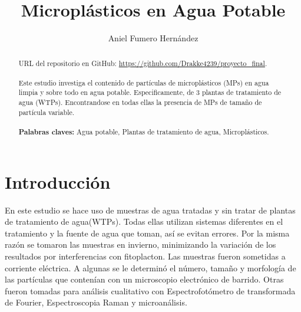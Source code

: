 \documentclass[a4paper,11pt]{article}
\title{Microplásticos en Agua Potable}
\author{Aniel Fumero Hernández}
\begin{document}
\maketitle
	\begin{abstract}
	
	URL del repositorio en GitHub:  \href{https://github.com/Drakke4239/proyecto\_final}{https://github.com/Drakke4239/proyecto\_final}.\\
	\\Este estudio investiga el contenido de partículas de microplásticos (MPs) en agua limpia y sobre todo en agua potable. Especificamente, de 3 plantas de tratamiento de agua (WTPs). Encontrandose en todas ellas la presencia de MPs de tamaño de partícula variable.\\\\
	\textbf{Palabras claves:} Agua potable, Plantas de tratamiento de agua, Microplásticos.
	
	\end{abstract}
\tableofcontents
\section{Introducción}
En este estudio se hace uso de muestras de agua tratadas y sin tratar de plantas de tratamiento de agua(WTPs). Todas ellas utilizan sistemas diferentes en el tratamiento y la fuente de agua que toman, así se evitan errores. Por la misma razón se tomaron las muestras en invierno, minimizando la variación de los resultados por interferencias con fitoplacton.
Las muestras fueron sometidas a corriente eléctrica. A algunas se le determinó el número, tamaño y morfología de las partículas que contenían con un microscopio electrónico de barrido. Otras fueron tomadas para análisis cualitativo con Espectrofotómetro de transformada de Fourier, Espectroscopia Raman y microanálisis.
\end{document}
